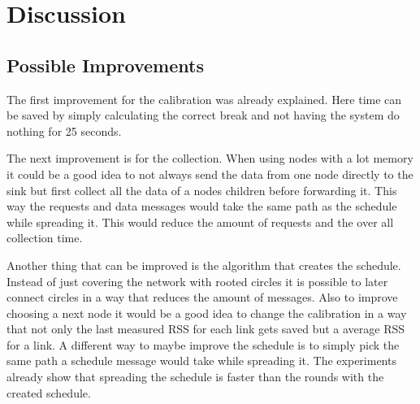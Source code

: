 \chapter{Discussion}



\section{Possible Improvements}
The first improvement for the calibration was already explained. Here time can be saved by simply calculating the correct break and not having the system do nothing for 25 seconds.

The next improvement is for the collection. When using nodes with a lot memory it could be a good idea to not always send the data from one node directly to the sink but first collect all the data of a nodes children before forwarding it. This way the requests and data messages would take the same path as the schedule while spreading it. This would reduce the amount of requests and the over all collection time.
 
Another thing that can be improved is the algorithm that creates the schedule. Instead of just covering the network with rooted circles it is possible to later connect circles in a way that reduces the amount of messages. Also to improve choosing a next node it would be a good idea to change the calibration in a way that not only the last measured RSS for each link gets saved but a average RSS for a link.
A different way to maybe improve the schedule is to simply pick the same path a schedule message would take while spreading it. The experiments already show that spreading the schedule is faster than the rounds with the created schedule. 

